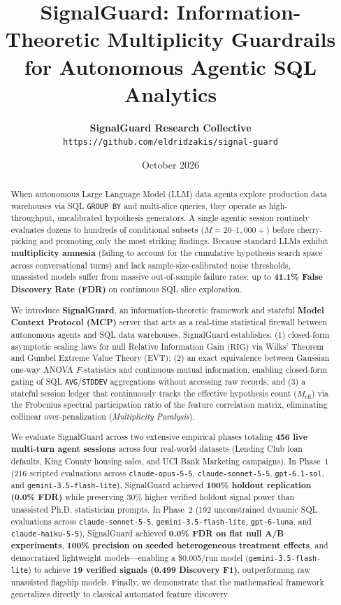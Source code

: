 \documentclass[11pt,a4paper]{article}
\title{\textbf{SignalGuard: Information-Theoretic Multiplicity Guardrails for Autonomous Agentic SQL Analytics}}
\author{
  \textbf{SignalGuard Research Collective} \\
  \texttt{https://github.com/eldridzakis/signal-guard}
}
\date{October 2026}
\begin{document}
\maketitle

\begin{abstract}
When autonomous Large Language Model (LLM) data agents explore production data warehouses via SQL \texttt{GROUP BY} and multi-slice queries, they operate as high-throughput, uncalibrated hypothesis generators. A single agentic session routinely evaluates dozens to hundreds of conditional subsets ($M = 20\text{--}1{,}000+$) before cherry-picking and promoting only the most striking findings. Because standard LLMs exhibit \textbf{multiplicity amnesia} (failing to account for the cumulative hypothesis search space across conversational turns) and lack sample-size-calibrated noise thresholds, unassisted models suffer from massive out-of-sample failure rates: up to \textbf{41.1\% False Discovery Rate (FDR)} on continuous SQL slice exploration.

We introduce \textbf{SignalGuard}, an information-theoretic framework and stateful \textbf{Model Context Protocol (MCP)} server that acts as a real-time statistical firewall between autonomous agents and SQL data warehouses. SignalGuard establishes: (1) closed-form asymptotic scaling laws for null Relative Information Gain ($\text{RIG}$) via Wilks' Theorem and Gumbel Extreme Value Theory (EVT); (2) an exact equivalence between Gaussian one-way ANOVA $F$-statistics and continuous mutual information, enabling closed-form gating of SQL \texttt{AVG}/\texttt{STDDEV} aggregations without accessing raw records; and (3) a stateful session ledger that continuously tracks the effective hypothesis count ($M_{\text{eff}}$) via the Frobenius spectral participation ratio of the feature correlation matrix, eliminating collinear over-penalization (\textit{Multiplicity Paralysis}).

We evaluate SignalGuard across two extensive empirical phases totaling \textbf{456 live multi-turn agent sessions} across four real-world datasets (Lending Club loan defaults, King County housing sales, and UCI Bank Marketing campaigns). In Phase~1 (216 scripted evaluations across \texttt{claude-opus-5-5}, \texttt{claude-sonnet-5-5}, \texttt{gpt-6.1-sol}, and \texttt{gemini-3.5-flash-lite}), SignalGuard achieved \textbf{100\% holdout replication (0.0\% FDR)} while preserving 30\% higher verified holdout signal power than unassisted Ph.D. statistician prompts. In Phase~2 (192 unconstrained dynamic SQL evaluations across \texttt{claude-sonnet-5-5}, \texttt{gemini-3.5-flash-lite}, \texttt{gpt-6-luna}, and \texttt{claude-haiku-5-5}), SignalGuard achieved \textbf{0.0\% FDR on flat null A/B experiments}, \textbf{100\% precision on seeded heterogeneous treatment effects}, and democratized lightweight models---enabling a \$0.005/run model (\texttt{gemini-3.5-flash-lite}) to achieve \textbf{19 verified signals (0.499 Discovery F1)}, outperforming raw unassisted flagship models. Finally, we demonstrate that the mathematical framework generalizes directly to classical automated feature discovery.
\end{abstract}
\end{document}
